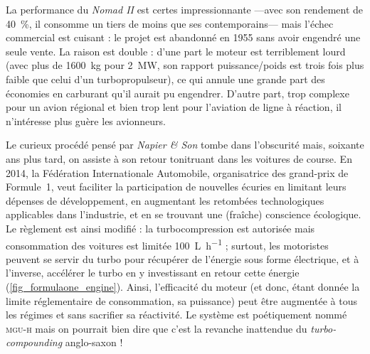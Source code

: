 La performance du \textit{Nomad II} est certes impressionnante —avec son rendement de \SI{40}{\percent}, il consomme un tiers de moins que ses contemporains— mais l’échec commercial est cuisant : le projet est abandonné en 1955 sans avoir engendré une seule vente. La raison est double : d’une part le moteur est terriblement lourd (avec plus de \SI{1600}{\kilogram} pour \SI{2}{\mega\watt}, son rapport puissance/poids est trois fois plus faible que celui d’un turbopropulseur), ce qui annule une grande part des économies en carburant qu’il aurait pu engendrer. D’autre part, trop complexe pour un avion régional et bien trop lent pour l’aviation de ligne à réaction, il n’intéresse plus guère les avionneurs.

Le curieux procédé pensé par \textit{Napier \& Son} tombe dans l’obscurité mais, soixante ans plus tard, on assiste à son retour tonitruant dans les voitures de course. En 2014, la Fédération Internationale Automobile, organisatrice des grand-prix de Formule~1, veut faciliter la participation de nouvelles écuries en limitant leurs dépenses de développement, en augmentant les retombées technologiques applicables dans l’industrie, et en se trouvant une (fraîche) conscience écologique. Le règlement est ainsi modifié : la turbocompression est autorisée mais consommation des voitures est limitée \SI[per-mode=symbol]{100}{\liter\per\hour} ; surtout, les motoristes peuvent se servir du turbo pour récupérer de l’énergie sous forme électrique, et à l’inverse, accélérer le turbo en y investissant en retour cette énergie (\cref{fig_formulaone_engine}). Ainsi, l’efficacité du moteur (et donc, étant donnée la limite réglementaire de consommation, sa puissance) peut être augmentée à tous les régimes et sans sacrifier sa réactivité. Le système est poétiquement nommé \textsc{mgu-h} mais on pourrait bien dire que c’est la revanche inattendue du \textit{turbo-compounding} anglo-saxon !

